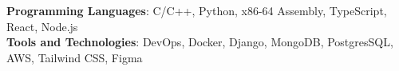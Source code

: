\begin{itemize}[leftmargin=0in, label={}]
    \small{\item{
     \textbf{Programming Languages}{: C/C++, Python, x86-64 Assembly,
     TypeScript, React, Node.js} \\
     \textbf{Tools and Technologies}{: DevOps, Docker, Django, MongoDB,
     PostgresSQL, AWS, Tailwind
     CSS, Figma} \\
    }}
\end{itemize}